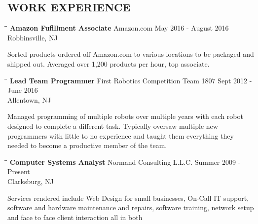 \documentclass{res}
\begin{document}
\begin{resume}
\section{WORK EXPERIENCE}
   \vspace{-0.1in}	
   \begin{tabbing}
   \hspace{2.3in}\= \hspace{2.6in}\= \kill %
    {\bf Amazon Fufillment Associate} \>Amazon.com    \>May 2016 - August 2016\\
                             \>Robbinsville, NJ
   \end{tabbing}\vspace{-20pt}      %
    Sorted products ordered off Amazon.com to various locations to be packaged and shipped out. Averaged over 1,200 products per hour, top associate.
   \vspace{-0.2in}
   \begin{tabbing}
   \hspace{2.3in}\= \hspace{2.6in}\= \kill %
    {\bf Lead Team Programmer} \>First Robotics Competition Team 1807 \>  Sept 2012 - June 2016 \\
                          \>Allentown, NJ
   \end{tabbing}\vspace{-20pt}         %
    Managed programming of multiple robots over multiple years with each robot designed to complete a different task. Typically oversaw multiple new programmers with little to no experience
     and taught  them everything they needed to become a productive member of the team. 
   \vspace{-0.2in}
   \begin{tabbing}
   \hspace{2.3in}\= \hspace{2.6in}\= \kill %
   {\bf Computer Systems Analyst}  \>Normand Consulting L.L.C. \> Summer 2009 - Present\\
                          \>Clarksburg, NJ
   \end{tabbing}\vspace{-20pt}            %
    Services rendered include Web Design for small businesses, On-Call IT support, software and hardware maintenance and repairs, software training, network setup and face to face client interaction all in both

\end{resume}
\end{document}
